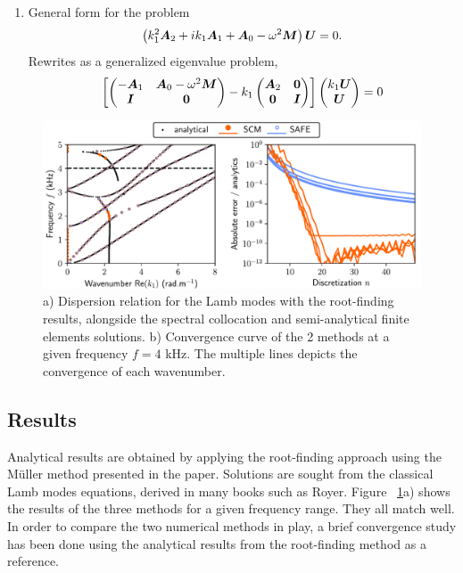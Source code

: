 \begin{enumerate}
\item General form for the problem
\begin{equation}
    \left( k_1^2 \boldsymbol A_2 + ik_1 \boldsymbol A_1 + \boldsymbol A_0 - \omega^2 \boldsymbol M \right) \boldsymbol U = 0.
\end{equation}
Rewrites as a generalized eigenvalue problem,
\begin{equation}
    \left[\begin{pmatrix}
         -\boldsymbol A_1 & \boldsymbol A_0 - \omega^2\boldsymbol  M\\
         \boldsymbol I & \boldsymbol 0 
    \end{pmatrix} - k_1 \begin{pmatrix}
        \boldsymbol A_2 & \boldsymbol 0\\ \boldsymbol 0 & \boldsymbol I 
    \end{pmatrix}\right] \begin{pmatrix}
        k_1 \boldsymbol U \\ \boldsymbol U 
    \end{pmatrix} = 0
\end{equation}
\end{enumerate}


\begin{figure}[h!]
    \centering
    \includegraphics{./chapitres/annexes/figs/figure.pdf}
    \caption{a) Dispersion relation for the Lamb modes with the root-finding results, alongside the spectral collocation and semi-analytical finite elements solutions. b) Convergence curve of the 2 methods at a given frequency $f=4$ kHz. The multiple lines depicts the convergence of each wavenumber.}
    \label{fig:conv_scm_safe_lamb}
\end{figure}

\subsection{Results}
Analytical results are obtained by applying the root-finding approach using the Müller method presented in the paper. Solutions are sought from the classical Lamb modes equations, derived in many books such as Royer. Figure ~\ref{fig:conv_scm_safe_lamb}a) shows the results of the three methods for a given frequency range. They all match well. In order to compare the two numerical methods in play, a brief convergence study has been done using the analytical results from the root-finding method as a reference. 

